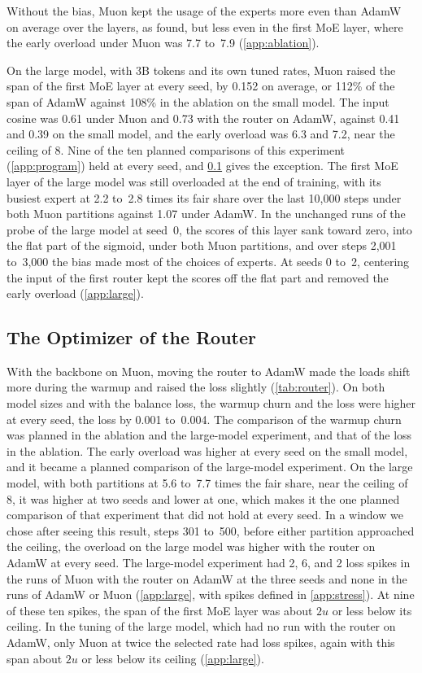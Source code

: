 \documentclass[11pt, a4paper]{article}
\begin{document}
Without the bias, Muon kept the usage of the experts more even than AdamW on average over the layers, as \citet{wang2026depth} found, but less even in the first MoE layer, where the early overload under Muon was 7.7 to~7.9 (\cref{app:ablation}).

On the large model, with 3B tokens and its own tuned rates, Muon raised the span of the first MoE layer at every seed, by 0.152 on average, or 112\% of the span of AdamW against 108\% in the ablation on the small model. The input cosine was 0.61 under Muon and 0.73 with the router on AdamW, against 0.41 and 0.39 on the small model, and the early overload was 6.3 and 7.2, near the ceiling of 8. Nine of the ten planned comparisons of this experiment (\cref{app:program}) held at every seed, and \cref{sec:router} gives the exception. The first MoE layer of the large model was still overloaded at the end of training, with its busiest expert at 2.2 to~2.8 times its fair share over the last 10,000 steps under both Muon partitions against 1.07 under AdamW\@. In the unchanged runs of the probe of the large model at seed~0, the scores of this layer sank toward zero, into the flat part of the sigmoid, under both Muon partitions, and over steps 2,001 to~3,000 the bias made most of the choices of experts. At seeds 0 to~2, centering the input of the first router kept the scores off the flat part and removed the early overload (\cref{app:large}).

\subsection{The Optimizer of the Router}
\label{sec:router}

With the backbone on Muon, moving the router to AdamW made the loads shift more during the warmup and raised the loss slightly (\cref{tab:router}). On both model sizes and with the balance loss, the warmup churn and the loss were higher at every seed, the loss by 0.001 to~0.004. The comparison of the warmup churn was planned in the ablation and the large-model experiment, and that of the loss in the ablation. The early overload was higher at every seed on the small model, and it became a planned comparison of the large-model experiment. On the large model, with both partitions at 5.6 to~7.7 times the fair share, near the ceiling of 8, it was higher at two seeds and lower at one, which makes it the one planned comparison of that experiment that did not hold at every seed. In a window we chose after seeing this result, steps 301 to~500, before either partition approached the ceiling, the overload on the large model was higher with the router on AdamW at every seed. The large-model experiment had 2, 6, and 2 loss spikes in the runs of Muon with the router on AdamW at the three seeds and none in the runs of AdamW or Muon (\cref{app:large}, with spikes defined in \cref{app:stress}). At nine of these ten spikes, the span of the first MoE layer was about $2u$ or less below its ceiling. In the tuning of the large model, which had no run with the router on AdamW, only Muon at twice the selected rate had loss spikes, again with this span about $2u$ or less below its ceiling (\cref{app:large}).
\end{document}
